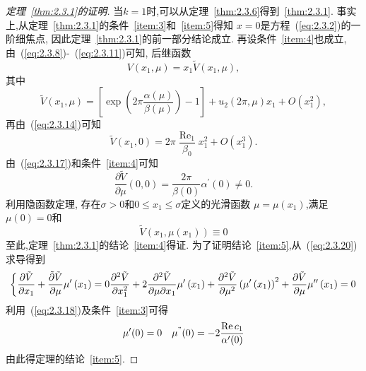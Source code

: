 \begin{proof}[定理~\ref{thm:2.3.1}的证明]
  当$k=1$时,可以从定理~\ref{thm:2.3.6}得到~\ref{thm:2.3.1}.
  事实上,从定理~\ref{thm:2.3.1}的条件~\ref{item:3}和~\ref{item:5}得知
  $x=0$是方程~(\ref{eq:2.3.2})的一阶细焦点,
  因此定理~\ref{thm:2.3.1}的前一部分结论成立.
  再设条件~\ref{item:4}也成立,
  由~(\ref{eq:2.3.8})-~(\ref{eq:2.3.11})可知,
  后继函数
\begin{equation}
    \label{eq:2.3.16}
V\left(x_{1}, \mu\right)=x_{1} \tilde{V}\left(x_{1}, \mu\right),
\end{equation}
其中
\begin{equation}
  \label{eq:2.3.17}
\tilde{V}\left(x_{1}, \mu\right)=\left[\exp \left(2 \pi \frac{\alpha(\mu)}{\beta(\mu)}\right)-1\right]+u_{2}(2 \pi, \mu) x_{1}+O\left(x_{1}^{2}\right),
\end{equation}
再由~(\ref{eq:2.3.14})可知
\begin{equation}
  \label{eq:2.3.18}
\tilde{V}\left(x_{1}, 0\right)=2 \pi \frac{\operatorname{Re}_{1}}{\beta_{0}} x_{1}^{2}+O\left(x_{1}^{3}\right).
\end{equation}
由~(\ref{eq:2.3.17})和条件~\ref{item:4}可知
\begin{equation}
  \label{eq:2.3.19}
\frac{\partial \tilde{V}}{\partial \mu}(0,0)=\frac{2 \pi}{\beta(0)} \alpha^{\prime}(0) \neq 0.
\end{equation}
利用隐函数定理,
存在$\sigma>0$和$0 \leqslant x_{1} \leqslant \sigma$定义的光滑函数
$\mu=\mu(x_1)$,满足$\mu(0)=0$和
\begin{equation}
\label{eq:2.3.20}  
\tilde{V}\left(x_{1}, \mu\left(x_{1}\right)\right) \equiv 0
\end{equation}
至此,定理~\ref{thm:2.3.1}的结论~\ref{item:4}得证.
为了证明结论~\ref{item:5},从~(\ref{eq:2.3.20})求导得到
\begin{equation}
  \label{eq:2.3.21}
  \left\{
    \frac{\partial \tilde{V}}{\partial x_{1}}+\frac{\tilde{\partial} \tilde{V}}{\partial \mu} \mu^{\prime}\left(x_{1}\right)=0\\
    \frac{\partial^{2} \tilde{V}}{\partial x_{1}^{2}}+2 \frac{\partial^{2} \tilde{V}}{\partial \mu \partial x_{1}} \mu^{\prime}\left(x_{1}\right)+\frac{\partial^{2} \tilde{V}}{\partial \mu^{2}}\left(\mu^{\prime}\left(x_{1}\right)\right)^{2}+\frac{\partial \tilde{V}}{\partial \mu} \mu^{\prime \prime}\left(x_{1}\right)=0
    \right.
  \end{equation}
  利用~(\ref{eq:2.3.18})及条件~\ref{item:3}可得
  $$
\mu^{\prime}(0)=0 \quad \mu^{"}(0)=-2 \frac{\operatorname{Re} c_{1}}{\alpha^{\prime}(0)}
$$
由此得定理的结论~\ref{item:5}.
\end{proof}
